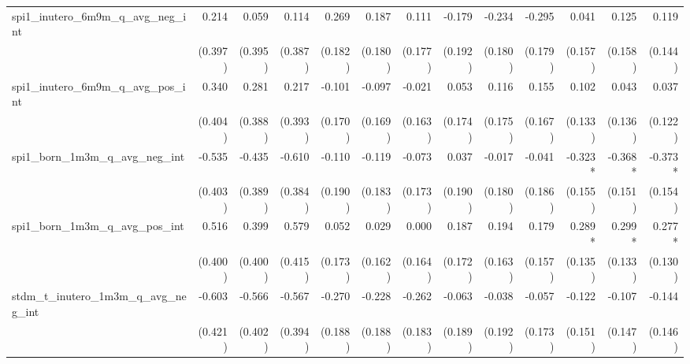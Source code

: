 \begin{tabular}{lrrrrrrrrrrrr}
spi1\_inutero\_6m9m\_q\_avg\_neg\_int       &        0.214 &        0.059 &        0.114 &        0.269 &        0.187 &        0.111 &       -0.179 &       -0.234 &       -0.295 &        0.041 &        0.125 &        0.119 \\ 
                                            &      (0.397) &      (0.395) &      (0.387) &      (0.182) &      (0.180) &      (0.177) &      (0.192) &      (0.180) &      (0.179) &      (0.157) &      (0.158) &      (0.144) \\ 
spi1\_inutero\_6m9m\_q\_avg\_pos\_int       &        0.340 &        0.281 &        0.217 &       -0.101 &       -0.097 &       -0.021 &        0.053 &        0.116 &        0.155 &        0.102 &        0.043 &        0.037 \\ 
                                            &      (0.404) &      (0.388) &      (0.393) &      (0.170) &      (0.169) &      (0.163) &      (0.174) &      (0.175) &      (0.167) &      (0.133) &      (0.136) &      (0.122) \\ 
spi1\_born\_1m3m\_q\_avg\_neg\_int          &       -0.535 &       -0.435 &       -0.610 &       -0.110 &       -0.119 &       -0.073 &        0.037 &       -0.017 &       -0.041 &      -0.323* &      -0.368* &      -0.373* \\ 
                                            &      (0.403) &      (0.389) &      (0.384) &      (0.190) &      (0.183) &      (0.173) &      (0.190) &      (0.180) &      (0.186) &      (0.155) &      (0.151) &      (0.154) \\ 
spi1\_born\_1m3m\_q\_avg\_pos\_int          &        0.516 &        0.399 &        0.579 &        0.052 &        0.029 &        0.000 &        0.187 &        0.194 &        0.179 &       0.289* &       0.299* &       0.277* \\ 
                                            &      (0.400) &      (0.400) &      (0.415) &      (0.173) &      (0.162) &      (0.164) &      (0.172) &      (0.163) &      (0.157) &      (0.135) &      (0.133) &      (0.130) \\ 
stdm\_t\_inutero\_1m3m\_q\_avg\_neg\_int    &       -0.603 &       -0.566 &       -0.567 &       -0.270 &       -0.228 &       -0.262 &       -0.063 &       -0.038 &       -0.057 &       -0.122 &       -0.107 &       -0.144 \\ 
                                            &      (0.421) &      (0.402) &      (0.394) &      (0.188) &      (0.188) &      (0.183) &      (0.189) &      (0.192) &      (0.173) &      (0.151) &      (0.147) &      (0.146) \\ 

\end{tabular}
